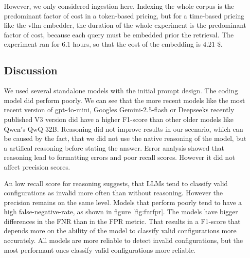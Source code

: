 However, we only considered ingestion here. Indexing the whole corpus is the predominant factor of cost in a token-based pricing, but for a time-based pricing like the vllm embedder, the duration of the whole experiment is the predominant factor of cost, because each query must be embedded prior the retrieval. The experiment ran for 6.1 hours, so that the cost of the embedding is 4.21 \$. 



\subsection{Discussion} \label{sec:exp_discussion}

We used several standalone models with the initial prompt design. The coding model did perform poorly. We can see that the more recent models like the most recent version of gpt-4o-mini, Googles Gemini-2.5-flash or Deepseeks recently published V3 version did have a higher F1-score than other older models like Qwen's QwQ-32B. Reasoning did not improve results in our scenario, which can be caused by the fact, that we did not use the native reasoning of the model, but a artifical reasoning before stating the answer. Error analysis showed that reasoning lead to formatting errors and poor recall scores. However it did not affect precision scores. 

An low recall score for reasoning suggests, that LLMs tend to classify valid configurations as invalid more often than without reasoning. However the precision remains on the same level. Models that perform poorly tend to have a high false-negative-rate, as shown in figure \ref{fig:fnrfpr}. The models have bigger differences in the FNR than in the FPR metric. That results in a F1-score that depends more on the ability of the model to classify valid configurations more accurately. All models are more reliable to detect invalid configurations, but the most performant ones classify valid configurations more reliable.

